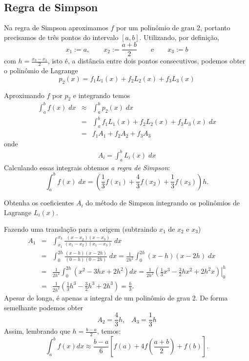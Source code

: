 \subsection{Regra de Simpson}
Na regra de Simpson aproximamos $f$ por um polinômio de grau $2$, portanto precisamos de três pontos do intervalo $[a,b]$. Utilizando, por definição,
$$
x_1:=a,\qquad x_2:=\frac{a+b}{2}\qquad \text{e}\qquad x_3:=b
$$
com $h=\frac{x_3-x_1}{2}$, isto é, a distância entre dois pontos consecutivos, podemos obter o polinômio de Lagrange
\begin{equation*}
    p_2(x) = f_1L_1(x) + f_2L_2(x)  + f_3L_3(x)
\end{equation*}

Aproximando $f$ por $p_2$ e integrando temos
\begin{eqnarray}
\int_a^bf(x)\;dx &\approx&\int_a^b p_2(x) \;dx \\
               &=&\int_a^b f_1L_1(x) + f_2L_2(x)  + f_3L_3(x) \;dx \\
               &=&f_1 A_1 + f_2A_2  + f_3A_3
\end{eqnarray}
onde
\begin{eqnarray}
  A_i = \int_a^b L_i(x) \;dx
\end{eqnarray}
Calculando essas integrais obtemos \emph{a regra de Simpson}:
$$
\int_a^bf(x)\;dx=\left(\frac{1}{3}f(x_1)+\frac{4}{3}f(x_2)+\frac{1}{3}f(x_3)\right)h.
$$

\begin{ex}
Obtenha os coeficientes $A_i$ do método de Simpson  integrando os polinômios de Lagrange $L_i(x)$.

Fazendo uma translação para a origem (subtraindo $x_1$ de $x_2$ e $x_3$)
\begin{eqnarray*}
   A_1 &=& \int_{x_1}^{x_3} \frac{(x-x_2)(x-x_3)}{(x_1-x_2)(x_1-x_3)}\;dx \\
       &=& \int_0^{2h} \frac{(x-h)(x-2h)}{(0-h)(0-2h)}\;dx
        =  \frac{1}{2h^2} \int_0^{2h} (x-h)(x-2h)\;dx \\
        &=& \frac{1}{2h^2} \int_0^{2h} \left(x^2 -3hx+2h^2\right)dx
        =  \frac{1}{2h^2} \left.\left(\frac{1}{3}x^3 -\frac{3}{2}hx^2+2h^2x\right)\right|_0^h \\
       &=& \frac{1}{2h^2} \left(\frac{1}{3}h^3 -\frac{3}{2}h^3+2h^3\right)
      = \frac{h}{3}.
\end{eqnarray*}
Apesar de longa, é apenas a integral de um polinômio de grau 2. De forma semelhante podemos obter
$$
A_2 = \frac{4}{3}h, \;\;\; A_3 = \frac{1}{3}h
$$
Assim, lembrando que $h=\frac{b-a}{2}$, temos:
\begin{equation}
 \int_a^b f(x)dx \approx \frac{b-a}{6}\left[f(a)+4f\left(\frac{a+b}{2}\right)+f(b)\right].
 \end{equation}

\end{ex}



